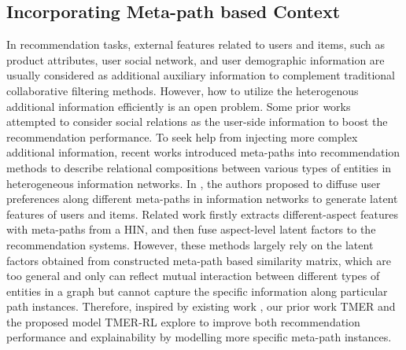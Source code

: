 \subsection{Incorporating Meta-path based Context}
\label{subsec_3.3}
In recommendation tasks, external features related to users and items, such as product attributes, user social network, and user demographic information are usually considered as additional auxiliary information to complement traditional collaborative filtering methods. However, how to utilize the heterogenous additional information efficiently is an open problem. Some prior works \cite{jamali2010matrix, ma2008sorec, yuan2011factorization} attempted to consider social relations as the user-side information to boost the recommendation performance.
To seek help from injecting more complex additional information, recent works \cite{yu2014personalized, han2018aspect} introduced meta-paths into recommendation methods to describe relational compositions between various types of entities in heterogeneous information networks. In \cite{yu2014personalized}, the authors proposed to diffuse user preferences along different meta-paths in information networks to generate latent features of users and items. Related work \cite{han2018aspect} firstly extracts different-aspect features with meta-paths from a HIN, and then fuse aspect-level latent factors to the recommendation systems. However, these methods largely rely on the latent factors obtained from constructed meta-path based similarity matrix, which are too general and only can reflect mutual interaction between different types of entities in a graph but cannot capture the specific information along particular path instances. Therefore, inspired by existing work \cite{hu2018leveraging}, our prior work TMER and the proposed model TMER-RL explore to improve both recommendation performance and explainability by modelling more specific meta-path instances. %


